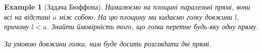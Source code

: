 \documentclass[a4paper, 10pt]{article}
\theoremstyle{theoremdd}
\newtheorem{example}[theorem]{Example}
\begin{document}
\begin{example}[Задача Бюффона]
Намалюємо на площині паралельні прямі, вони всі на відстані $a$ між собою. На цю площину ми кидаємо голку довжини $l$, причому $l < a$. Знайти ймовірність того, що голка перетне будь-яку одну пряму.
\begin{figure}[H]
\centering
{}
\end{figure}
\noindent
За умовою довжини голки, нам буде досить розглядати дві прямі.
\begin{figure}[H]
\centering
{}
\end{figure}
\end{example}
\end{document}
